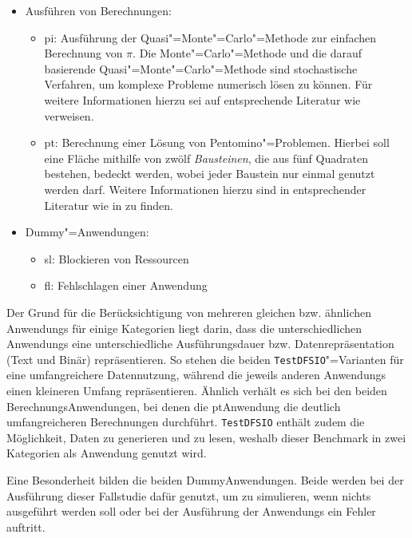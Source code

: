 \begin{itemize}
    \item Ausführen von Berechnungen:
    \begin{itemize}
        \item \acrlong{pi}: Ausführung der Quasi"=Monte"=Carlo"=Methode zur einfachen Berechnung von $\pi$.
            Die Monte"=Carlo"=Methode und die darauf basierende Quasi"=Monte"=Carlo"=Methode sind stochastische Verfahren, um komplexe Probleme numerisch lösen zu können.
            Für weitere Informationen hierzu sei auf entsprechende Literatur wie \zB \cite{Korn2010,Lemieux2009} verweisen.
        \item \gls{pt}: Berechnung einer Lösung von Pentomino"=Problemen.
            Hierbei soll eine Fläche mithilfe von zwölf \emph{Bausteinen}, die aus fünf Quadraten bestehen, bedeckt werden, wobei jeder Baustein nur einmal genutzt werden darf.
            Weitere Informationen hierzu sind in entsprechender Literatur wie \zB in \cite{Golomb1995} zu finden.
    \end{itemize}

    \item Dummy"=Anwendungen:
    \begin{itemize}
        \item  \gls{sl}: Blockieren von Ressourcen
        \item  \gls{fl}: Fehlschlagen einer Anwendung
    \end{itemize}
\end{itemize}

Der Grund für die Berücksichtigung von mehreren gleichen bzw. ähnlichen \glspl{Anwendung} für einige Kategorien liegt darin, dass die unterschiedlichen \glspl{Anwendung} eine unterschiedliche Ausführungsdauer bzw. Datenrepräsentation (Text und Binär) repräsentieren.
So stehen die beiden \texttt{TestDFSIO}"=Varianten für eine umfangreichere Datennutzung, während die jeweils anderen \glspl{Anwendung} einen kleineren Umfang repräsentieren.
Ähnlich verhält es sich bei den beiden Berechnungs\gls{Anwendung}en, bei denen die \acrlong{pt}\gls{Anwendung} die deutlich umfangreicheren Berechnungen durchführt.
\texttt{TestDFSIO} enthält zudem die Möglichkeit, Daten zu generieren und zu lesen, weshalb dieser Benchmark in zwei Kategorien als \gls{Anwendung} genutzt wird.

Eine Besonderheit bilden die beiden Dummy\gls{Anwendung}en.
Beide werden bei der Ausführung dieser Fallstudie dafür genutzt, um zu simulieren, wenn nichts ausgeführt werden soll oder bei der Ausführung der \glspl{Anwendung} ein Fehler auftritt.

